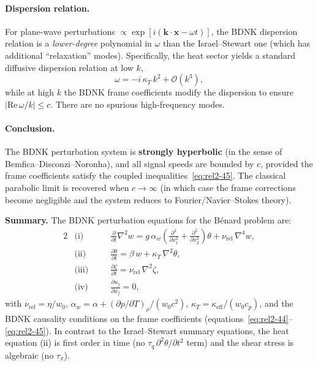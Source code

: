 \paragraph{Dispersion relation.}
For plane-wave perturbations $\propto \exp[i(\mathbf{k}\cdot\mathbf{x} - \omega t)]$,
the BDNK dispersion relation is a \emph{lower-degree} polynomial in $\omega$
than the Israel--Stewart one (which has additional ``relaxation'' modes).
Specifically, the heat sector yields a standard diffusive dispersion
relation at low $k$,
\begin{equation}
\label{eq:rel2-47}
  \omega = -i\,\kappa_T\,k^2 + \mathcal{O}(k^3),
\end{equation}
while at high $k$ the BDNK frame coefficients modify the dispersion to
ensure $|\mathrm{Re}\,\omega/k| \le c$.  There are no spurious
high-frequency modes.

\paragraph{Conclusion.}
The BDNK perturbation system is \textbf{strongly hyperbolic}
(in the sense of Bemfica--Disconzi--Noronha), and all signal speeds are
bounded by $c$, provided the frame coefficients satisfy the coupled
inequalities~\eqref{eq:rel2-45}.  The classical parabolic limit is
recovered when $c \to \infty$ (in which case the frame corrections become
negligible and the system reduces to Fourier/Navier--Stokes theory).

\medskip
\noindent\textbf{Summary.}\quad
The BDNK perturbation equations for the B\'enard problem are:
\begin{alignat}{2}
\label{eq:rel2-summary}
  &\text{(i)}\quad
  &&\frac{\partial}{\partial t}\nabla^2 w
  = g\,\alpha_w\!\left(\frac{\partial^2}{\partial x_1^2}
    + \frac{\partial^2}{\partial x_2^2}\right)\theta
  + \nu_{\mathrm{rel}}\,\nabla^4 w, \\[4pt]
\label{eq:rel2-summary2}
  &\text{(ii)}\quad
  &&\frac{\partial\theta}{\partial t}
  = \beta\,w + \kappa_T\,\nabla^2\theta, \\[4pt]
\label{eq:rel2-summary3}
  &\text{(iii)}\quad
  &&\frac{\partial\zeta}{\partial t}
  = \nu_{\mathrm{rel}}\,\nabla^2\zeta, \\[4pt]
\label{eq:rel2-summary4}
  &\text{(iv)}\quad
  &&\frac{\partial u_j}{\partial x_j} = 0,
\end{alignat}
with $\nu_{\mathrm{rel}} = \eta/w_0$,
$\alpha_w = \alpha + (\partial p/\partial T)_\rho / (w_0 c^2)$,
$\kappa_T = \kappa_{\mathrm{eff}}/(w_0 c_p)$, and the BDNK causality
conditions on the frame coefficients
(equations~\eqref{eq:rel2-44}--\eqref{eq:rel2-45}).  In contrast to the
Israel--Stewart summary equations, the heat equation (ii) is first order in
time (no $\tau_q\,\partial^2\theta/\partial t^2$ term) and the shear stress
is algebraic (no $\tau_\pi$).

